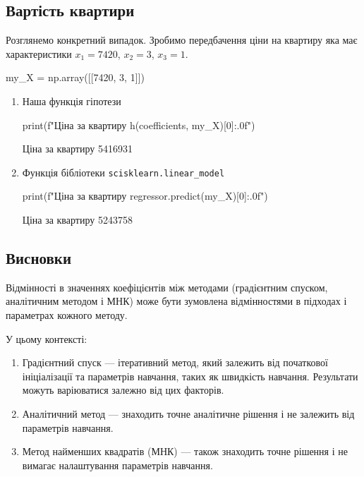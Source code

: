 \documentclass[]{article}
\newcounter{pythoncode}
\begin{document}
\subsection{Вартість квартири}

Розглянемо конкретний випадок. Зробимо передбачення ціни на квартиру яка
має характеристики \(x_1 = 7420\), \(x_2 = 3\), \(x_3 = 1\).

\begin{pythoncode}
my_X = np.array([[7420, 3, 1]])
\end{pythoncode}

\begin{enumerate}
	\item Наша функція гіпотези

\begin{pythoncode}
print(f"Ціна за квартиру {h(coefficients, my_X)[0]:.0f}")
\end{pythoncode}

\begin{out}
	Ціна за квартиру 5416931
\end{out}

\item Функція бібліотеки \texttt{scisklearn.linear\_model}

\begin{pythoncode}
print(f"Ціна за квартиру {regressor.predict(my_X)[0]:.0f}")
\end{pythoncode}

\begin{out}
	Ціна за квартиру 5243758
\end{out}
\end{enumerate}

\subsection{Висновки}

Відмінності в значеннях коефіцієнтів між методами (градієнтним спуском,
аналітичним методом і МНК) може бути зумовлена відмінностями в підходах
і параметрах кожного методу.

У цьому контексті:

\begin{enumerate}
	\def\labelenumi{\arabic{enumi}.}
	\item
	      Градієнтний спуск --- ітеративний метод, який залежить від початкової
	      ініціалізації та параметрів навчання, таких як швидкість навчання.
	      Результати можуть варіюватися залежно від цих факторів.
	\item
	      Аналітичний метод --- знаходить точне аналітичне рішення і не залежить
	      від параметрів навчання.
	\item
	      Метод найменших квадратів (МНК) --- також знаходить точне рішення і не
	      вимагає налаштування параметрів навчання.
\end{enumerate}
\end{document}

